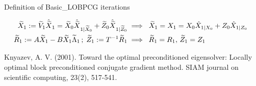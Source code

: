 \documentclass[t,usepdftitle=false]{beamer}
\begin{document}
\begin{frame}{Definition of Basic\_LOBPCG iterations}
\begin{itemize}
\begin{itemize}
\begin{align*}
	\widetilde{X}_1:=\widetilde{V}_{1}\hat{\widetilde{X}}_1=
	\widetilde{X}_{0}\hat{\widetilde{X}}_{1|\widetilde{X}_0}+
	\widetilde{Z}_{0}\hat{\widetilde{X}}_{1|\widetilde{Z}_0}
	&\implies\;\widetilde{X}_1=X_1=X_{0}\hat{X}_{1|X_0}+Z_{0}\hat{X}_{1|Z_0}\\
	\hspace{-1.1cm}
	\widetilde{R}_1:=A\widetilde{X}_1-B\widetilde{X}_1\widetilde{\Lambda}_1\,;\;\widetilde{Z}_1:=T^{-1}\widetilde{R}_1
	&\implies\;\widetilde{R}_1=R_1,\,\widetilde{Z}_1=Z_1
	\end{align*}
	\end{itemize}
	\end{itemize}
	\vspace{-.1cm}
	\tiny{Knyazev, A. V. (2001). Toward the optimal preconditioned eigensolver: Locally optimal block preconditioned conjugate gradient method. SIAM journal on scientific computing, 23(2), 517-541.}
\end{frame}
\end{document}
